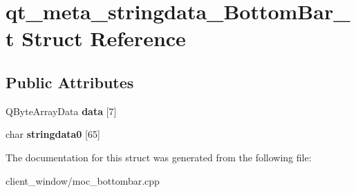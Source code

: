 \hypertarget{structqt__meta__stringdata__BottomBar__t}{}\section{qt\+\_\+meta\+\_\+stringdata\+\_\+\+Bottom\+Bar\+\_\+t Struct Reference}
\label{structqt__meta__stringdata__BottomBar__t}
\subsection*{Public Attributes}
\begin{DoxyCompactItemize}
\item 
Q\+Byte\+Array\+Data {\bfseries data} \mbox{[}7\mbox{]}\hypertarget{structqt__meta__stringdata__BottomBar__t_a31c40eb3ffd7606a87376bc3cd7a36d8}{}\label{structqt__meta__stringdata__BottomBar__t_a31c40eb3ffd7606a87376bc3cd7a36d8}

\item 
char {\bfseries stringdata0} \mbox{[}65\mbox{]}\hypertarget{structqt__meta__stringdata__BottomBar__t_ab491a699b2f3a5b397989489ca5c8134}{}\label{structqt__meta__stringdata__BottomBar__t_ab491a699b2f3a5b397989489ca5c8134}

\end{DoxyCompactItemize}


The documentation for this struct was generated from the following file\+:\begin{DoxyCompactItemize}
\item 
client\+\_\+window/moc\+\_\+bottombar.\+cpp\end{DoxyCompactItemize}
